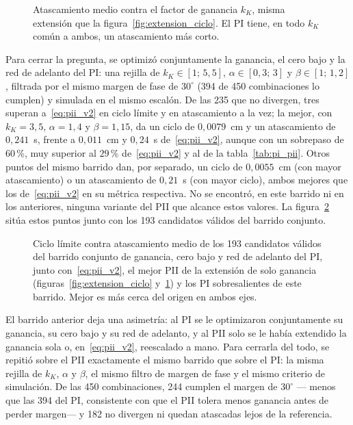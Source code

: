 \begin{figure}[ht]
    \centering
    
    \caption[Atascamiento al extender la ganancia]{Atascamiento medio contra el factor de ganancia $k_K$, misma extensión que la figura~\ref{fig:extension_ciclo}. El PI tiene, en todo $k_K$ común a ambos, un atascamiento más corto.}
    \label{fig:extension_atasco}
\end{figure}

Para cerrar la pregunta, se optimizó conjuntamente la ganancia, el cero bajo y la red de adelanto del PI: una rejilla de $k_K\in[1;\,5{,}5]$, $\alpha\in[0{,}3;\,3]$ y $\beta\in[1;\,1{,}2]$, filtrada por el mismo margen de fase de $30^\circ$ (394 de 450 combinaciones lo cumplen) y simulada en el mismo escalón. De las 235 que no divergen, tres superan a~\eqref{eq:pii_v2} en ciclo límite y en atascamiento a la vez; la mejor, con $k_K=3{,}5$, $\alpha=1{,}4$ y $\beta=1{,}15$, da un ciclo de $0{,}0079$~cm y un atascamiento de $0{,}241$~s, frente a $0{,}011$~cm y $0{,}24$~s de~\eqref{eq:pii_v2}, aunque con un sobrepaso de $60$\,\%, muy superior al $29$\,\% de~\eqref{eq:pii_v2} y al de la tabla~\ref{tab:pi_pii}. Otros puntos del mismo barrido dan, por separado, un ciclo de $0{,}0055$~cm (con mayor atascamiento) o un atascamiento de $0{,}21$~s (con mayor ciclo), ambos mejores que los de~\eqref{eq:pii_v2} en su métrica respectiva. No se encontró, en este barrido ni en los anteriores, ninguna variante del PII que alcance estos valores. La figura~\ref{fig:barrido_conjunto} sitúa estos puntos junto con los 193 candidatos válidos del barrido conjunto.

\begin{figure}[ht]
    \centering
    
    \caption[Barrido conjunto del PI contra PII\_V2]{Ciclo límite contra atascamiento medio de los 193 candidatos válidos del barrido conjunto de ganancia, cero bajo y red de adelanto del PI, junto con~\eqref{eq:pii_v2}, el mejor PII de la extensión de solo ganancia (figuras~\ref{fig:extension_ciclo} y~\ref{fig:extension_atasco}) y los PI sobresalientes de este barrido. Mejor es más cerca del origen en ambos ejes.}
    \label{fig:barrido_conjunto}
\end{figure}

El barrido anterior deja una asimetría: al PI se le optimizaron conjuntamente su ganancia, su cero bajo y su red de adelanto, y al PII solo se le había extendido la ganancia sola o, en~\eqref{eq:pii_v2}, reescalado a mano. Para cerrarla del todo, se repitió sobre el PII exactamente el mismo barrido que sobre el PI: la misma rejilla de $k_K$, $\alpha$ y $\beta$, el mismo filtro de margen de fase y el mismo criterio de simulación. De las 450 combinaciones, 244 cumplen el margen de $30^\circ$ --- menos que las 394 del PI, consistente con que el PII tolera menos ganancia antes de perder margen--- y 182 no divergen ni quedan atascadas lejos de la referencia.

